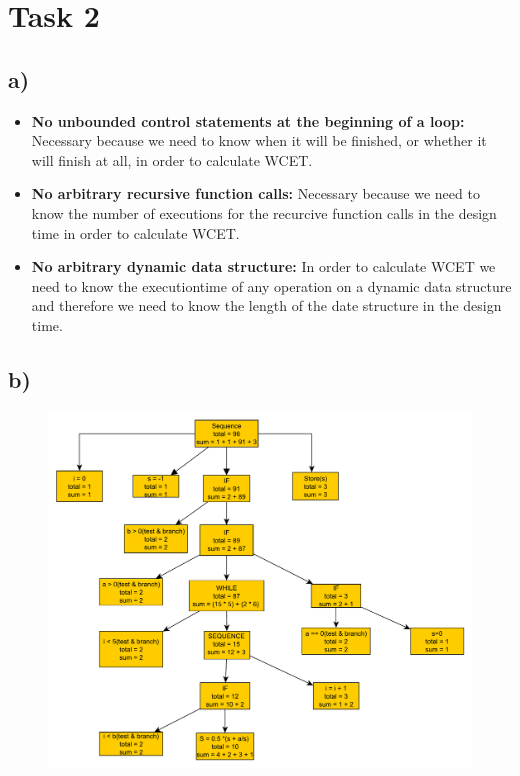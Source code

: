 \documentclass[10pt,a4paper]{article}
\begin{document}
\section*{Task 2}
\subsection*{a)}
\begin{itemize}
\item \textbf{No unbounded control statements at the beginning of a loop:}
\newline
Necessary because we need to know when it will be finished, or whether it will finish at all, in order to calculate WCET.

\item \textbf{No arbitrary recursive function calls:}
\newline
Necessary because we need to know the number of executions for the recurcive function calls in the design time in order to calculate WCET.

\item \textbf{No arbitrary dynamic data structure:}
In order to calculate WCET we need to know the executiontime of any operation on a dynamic data structure and therefore we need to know the length of the date structure in the design time.

\end{itemize}

\subsection*{b)}

\begin{figure}[h]
\includegraphics[width=\linewidth]{Ex1Task2b.pdf}
\end{figure}
\newpage
\end{document}
